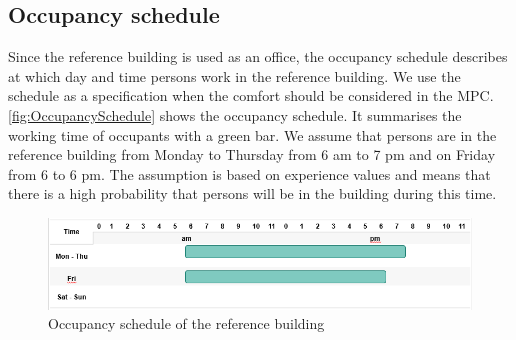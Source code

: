 \subsection{Occupancy schedule}
\label{subsec:OccupancySchedule}
Since the reference building is used as an office, the occupancy schedule describes at which day and time persons work in the reference building. We use the schedule as a specification when the comfort should be considered in the MPC. \autoref{fig:OccupancySchedule} shows the occupancy schedule. It summarises the working time of occupants with a green bar. We assume that persons are in the reference building from Monday to Thursday from 6 am to 7 pm and on Friday from 6 to 6 pm. The assumption is based on experience values and means that there is a high probability that persons will be in the building during this time.  
    \begin{figure}[H]
            \centering
            \includegraphics[width=15cm]{figure/Occupancy schedule.PNG}
           \caption{Occupancy schedule of the reference building}
           \label{fig:OccupancySchedule}
    \end{figure}

